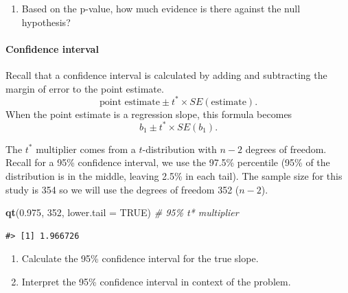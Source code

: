 \documentclass[
]{report}
\newenvironment{Shaded}{\begin{snugshade}}{\end{snugshade}}
\newcommand{\AttributeTok}[1]{\textcolor[rgb]{0.13,0.29,0.53}{#1}}
\newcommand{\CommentTok}[1]{\textcolor[rgb]{0.56,0.35,0.01}{\textit{#1}}}
\newcommand{\ConstantTok}[1]{\textcolor[rgb]{0.56,0.35,0.01}{#1}}
\newcommand{\DecValTok}[1]{\textcolor[rgb]{0.00,0.00,0.81}{#1}}
\newcommand{\FloatTok}[1]{\textcolor[rgb]{0.00,0.00,0.81}{#1}}
\newcommand{\FunctionTok}[1]{\textcolor[rgb]{0.13,0.29,0.53}{\textbf{#1}}}
\newcommand{\NormalTok}[1]{#1}
\providecommand{\tightlist}{%
  \setlength{\itemsep}{0pt}\setlength{\parskip}{0pt}}
\begin{document}
\vspace{0.5in}

\begin{enumerate}
\def\labelenumi{\arabic{enumi}.}
\setcounter{enumi}{10}
\tightlist
\item
  Based on the p-value, how much evidence is there against the null hypothesis?
\end{enumerate}

\vspace{0.5in}

\hypertarget{confidence-interval-11}{%
\paragraph*{Confidence interval}\label{confidence-interval-11}}

Recall that a confidence interval is calculated by adding and subtracting the margin of error to the point estimate.\\
\[\mbox{point estimate}\pm t^*\times SE(\mbox{estimate}).\]
When the point estimate is a regression slope, this formula becomes
\[b_1 \pm t^* \times SE(b_1).\]

The \(t^*\) multiplier comes from a \(t\)-distribution with \(n-2\) degrees of freedom. Recall for a 95\% confidence interval, we use the 97.5\% percentile (95\% of the distribution is in the middle, leaving 2.5\% in each tail). The sample size for this study is 354 so we will use the degrees of freedom 352 (\(n-2\)).

\begin{Shaded}
\begin{Highlighting}[]
\FunctionTok{qt}\NormalTok{(}\FloatTok{0.975}\NormalTok{, }\DecValTok{352}\NormalTok{, }\AttributeTok{lower.tail =} \ConstantTok{TRUE}\NormalTok{) }\CommentTok{\# 95\% t* multiplier }
\end{Highlighting}
\end{Shaded}

\begin{verbatim}
#> [1] 1.966726
\end{verbatim}

\begin{enumerate}
\def\labelenumi{\arabic{enumi}.}
\setcounter{enumi}{11}
\item
  Calculate the 95\% confidence interval for the true slope.
  \vspace{0.8in}
\item
  Interpret the 95\% confidence interval in context of the problem.
\end{enumerate}
\end{document}
